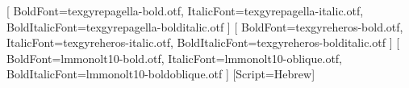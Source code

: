 \newcommand{\BookAuthor}{R. EverStarine}

\usepackage[a4paper,inner=28mm,outer=24mm,top=27mm,bottom=28mm,
	headheight=16pt,headsep=8mm,footskip=12mm]{geometry}

\usepackage{amsmath}
\usepackage{mathtools}
\usepackage{amsthm}
\usepackage{aliascnt}
\usepackage{unicode-math}
\setmainfont{texgyrepagella-regular.otf}[
	BoldFont=texgyrepagella-bold.otf,
	ItalicFont=texgyrepagella-italic.otf,
	BoldItalicFont=texgyrepagella-bolditalic.otf
]
\setsansfont{texgyreheros-regular.otf}[
	BoldFont=texgyreheros-bold.otf,
	ItalicFont=texgyreheros-italic.otf,
	BoldItalicFont=texgyreheros-bolditalic.otf
]
\setmonofont{lmmonolt10-regular.otf}[
	BoldFont=lmmonolt10-bold.otf,
	ItalicFont=lmmonolt10-oblique.otf,
	BoldItalicFont=lmmonolt10-boldoblique.otf
]
\newfontfamily{}
\newCJKfontfamily{}
\newfontfamily{}[Script=Hebrew]
\let\mathbb\relax
\DeclareMathAlphabet{\mathbb}{U}{msb}{m}{n}
\AtBeginDocument{%
	\let\varnothing\AlgebraRoundEmptySet
	\let\emptyset\AlgebraRoundEmptySet
}

